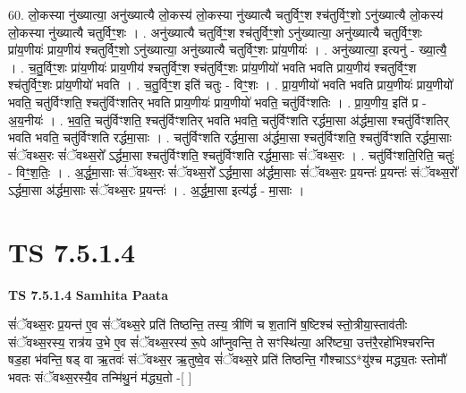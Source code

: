 \documentclass[17pt]{extarticle}
\begin{document}
60. लो॒कस्या नु॑ख्यात्या॒ अनु॑ख्यात्यै लो॒कस्य॑ लो॒कस्या नु॑ख्यात्यै चतुर्विꣳ॒॒श श्च॑तुर्विꣳ॒॒शो ऽनु॑ख्यात्यै लो॒कस्य॑ लो॒कस्या नु॑ख्यात्यै चतुर्विꣳ॒॒शः । . अनु॑ख्यात्यै चतुर्विꣳ॒॒श श्च॑तुर्विꣳ॒॒शो ऽनु॑ख्यात्या॒ अनु॑ख्यात्यै चतुर्विꣳ॒॒शः प्रा॑य॒णीयः॑ प्राय॒णीय॑ श्चतुर्विꣳ॒॒शो ऽनु॑ख्यात्या॒ अनु॑ख्यात्यै चतुर्विꣳ॒॒शः प्रा॑य॒णीयः॑ । . अनु॑ख्यात्या॒ इत्यनु॑ - ख्या॒त्यै॒ । . च॒तु॒र्विꣳ॒॒शः प्रा॑य॒णीयः॑ प्राय॒णीय॑ श्चतुर्विꣳ॒॒श श्च॑तुर्विꣳ॒॒शः प्रा॑य॒णीयो॑ भवति भवति प्राय॒णीय॑ श्चतुर्विꣳ॒॒श श्च॑तुर्विꣳ॒॒शः प्रा॑य॒णीयो॑ भवति । . च॒तु॒र्विꣳ॒॒श इति॑ चतुः - विꣳ॒॒शः । . प्रा॒य॒णीयो॑ भवति भवति प्राय॒णीयः॑ प्राय॒णीयो॑ भवति॒ चतु॑र्विꣳशति॒ श्चतु॑र्विꣳशतिर् भवति प्राय॒णीयः॑ प्राय॒णीयो॑ भवति॒ चतु॑र्विꣳशतिः । . प्रा॒य॒णीय॒ इति॑ प्र - अ॒य॒नीयः॑ । . भ॒व॒ति॒ चतु॑र्विꣳशति॒ श्चतु॑र्विꣳशतिर् भवति भवति॒ चतु॑र्विꣳशति रर्द्धमा॒सा अ॑र्द्धमा॒सा 
श्चतु॑र्विꣳशतिर् भवति भवति॒ चतु॑र्विꣳशति रर्द्धमा॒साः । . चतु॑र्विꣳशति रर्द्धमा॒सा अ॑र्द्धमा॒सा श्चतु॑र्विꣳशति॒ श्चतु॑र्विꣳशति रर्द्धमा॒साः सं॑ॅवथ्स॒रः सं॑ॅवथ्स॒रो᳚ ऽर्द्धमा॒सा श्चतु॑र्विꣳशति॒ श्चतु॑र्विꣳशति रर्द्धमा॒साः सं॑ॅवथ्स॒रः । . चतु॑र्विꣳशति॒रिति॒ चतुः॑ - विꣳ॒॒श॒तिः॒ । . अ॒र्द्ध॒मा॒साः सं॑ॅवथ्स॒रः सं॑ॅवथ्स॒रो᳚ ऽर्द्धमा॒सा अ॑र्द्धमा॒साः सं॑ॅवथ्स॒रः प्र॒यन्तः॑ प्र॒यन्तः॑ संॅवथ्स॒रो᳚ ऽर्द्धमा॒सा अ॑र्द्धमा॒साः सं॑ॅवथ्स॒रः प्र॒यन्तः॑ । . अ॒र्द्ध॒मा॒सा इत्य॑र्द्ध - मा॒साः । \newline
\pagebreak
{}

\section{ TS 7.5.1.4 }

\textbf{TS 7.5.1.4 } \newline
\textbf{Samhita Paata} \newline

सं॑ॅवथ्स॒रः प्र॒यन्त॑ ए॒व सं॑ॅवथ्स॒रे प्रति॑ तिष्ठन्ति॒ तस्य॒ त्रीणि॑ च श॒तानि॑ ष॒ष्टिश्च॑ स्तो॒त्रीया॒स्ताव॑तीः संॅवथ्स॒रस्य॒ रात्र॑य उ॒भे ए॒व सं॑ॅवथ्स॒रस्य॑ रू॒पे आ᳚प्नुवन्ति॒ ते सꣳस्थि॑त्या॒ अरि॑ष्ट्या॒ उत्त॑रै॒रहो॑भिश्चरन्ति षड॒हा भ॑वन्ति॒ षड् वा ऋ॒तवः॑ संॅवथ्स॒र ऋ॒तुष्वे॒व सं॑ॅवथ्स॒रे प्रति॑ तिष्ठन्ति॒ गौश्चाऽऽ*यु॑श्च मद्ध्य॒तः स्तोमौ॑ भवतः संॅवथ्स॒रस्यै॒व तन्मि॑थु॒नं म॑द्ध्य॒तो -[  ] \newline
\end{document}
